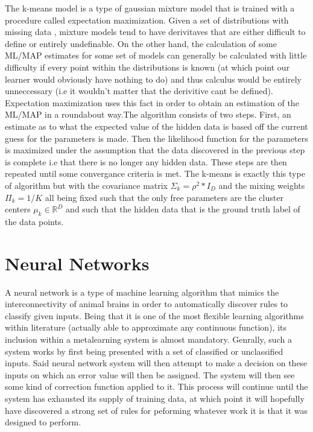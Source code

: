 The k-means model is a type of gaussian mixture model that is trained with a procedure
called expectation maximization. Given a set of distributions with missing data
, mixture models tend to have derivitaves that are either difficult to define
or entirely undefinable. On the other hand, the calculation of some ML/MAP
estimates for some set of models can generally be calculated with little
difficulty if every point within the distributions is known (at which point our
learner would obviously have nothing to do) and thus calculus would be entirely
unneccessary (i.e it wouldn't matter that the derivitive cant be defined).
Expectation maximization uses this fact in order to obtain an estimation of the
ML/MAP in a roundabout way.The algorithm consists of two steps. First, an estimate as
to what the expected value of the hidden data is based off the current guess for the
parameters is made. Then the likelihood function for the parameters is maximized under
the assumption that the data discovered in the previous step is complete i.e that there
is no longer any hidden data. These steps are then repeated until some convergance criteria
is met. The k-means is exactly this type of algorithm but with the covariance matrix
$\Sigma_{k} = \rho^{2}*I_{D}$ and the mixing weights $\Pi_{k} = 1/K$ all being fixed such
that the only free parameters are the cluster centers $\mu_{k} \in \mathbb{R}^{D}$
and such that the hidden data that is the ground truth label of the data points.
\section{Neural Networks}
A neural network is a type of machine learning algorithm that mimics
the interconnectivity of animal brains in order to automatically
discover rules to classify given inputs. Being that it is one of the most
flexible learning algorithms within literature (actually able to
approximate any continuous function)\cite{Hornik}, its inclusion within a
metalearning system is almost mandatory.  Genrally, such a system
works by first being presented with a set of classified or
unclassified inputs. Said neural network system will then attempt to
make a decision on these inputs on which an error value will then be
assigned. The system will then see some kind of correction function
applied to it. This process will continue until the system has
exhausted its supply of training data, at which point it will
hopefully have discovered a strong set of rules for peforming whatever
work it is that it was designed to perform.

